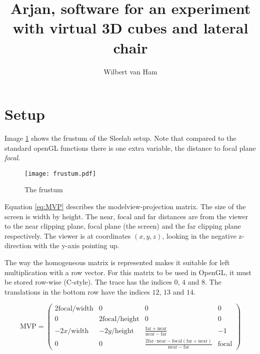 \documentclass{article}
\title{Arjan, software for an experiment with virtual 3D cubes and lateral chair}
\author{Wilbert van Ham}
\newcommand{\width}{\mathrm{width}}
\newcommand{\height}{\mathrm{height}}
\newcommand{\near}{\mathrm{near}}
\newcommand{\focal}{\mathrm{focal}}
\newcommand{\far}{\mathrm{far}}
\begin{document}
\maketitle
\section{Setup}
Image \ref{im:frustum} shows the frustum of the Sleelab setup. Note that compared to the standard 
openGL functions there is one extra variable, the distance to focal plane \textit{focal}.

\begin{figure}[hbt]
\texttt{[image: frustum.pdf]}
\caption{The frustum}
\label{im:frustum}
\end{figure}
Equation \ref{eq:MVP} describes the modelview-projection matrix. The size of
the screen is $\mathrm{width}$ by $\mathrm{height}$. The $\mathrm{near}$,
$\mathrm{focal}$ and $\mathrm{far}$ distances are from the viewer to the near clipping
plane, focal plane (the screen) and the far clipping plane respectively. The viewer
is at coordinates $(x, y, z)$, looking in the negative z-direction with
the y-axis pointing up. 

The way the homogeneous matrix is represented makes it suitable for left multiplication 
with a row vector. For this matrix to be used in OpenGL, it must be stored
row-wise (C-style). The trace has the indices $0$, $4$ and $8$. The translations in the bottom 
row have the indices $12$, $13$ and $14$.

\begin{equation}
\mathrm{MVP}=\left(
\begin{array}{cccc}
 2\focal/\width &               0 &                                                     0 &     0 \\
              0 & 2\focal/\height &                                                     0 &     0 \\
     -2x/\width &      -2y/\height &                         \frac{\far+\near}{\near-\far} &    -1 \\
              0 &               0 & \frac{2\far\cdot\near-\focal(\far+\near)}{\near-\far} & \focal
\end{array} 
\right)
\label{eq:MVP}
\end{equation}
\end{document}
